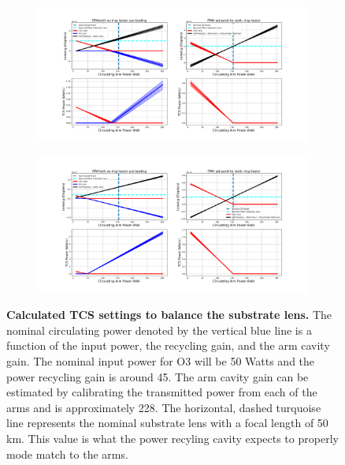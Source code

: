 \begin{figure}[ht]
	\centering
	\begin{subfigure}[b]{1.0\textwidth}
		\centering
		\includegraphics[width=\textwidth]{../Figures/ITMX_TCS_Settings.png}
		\label{fig:TCS_ITMX}
	\end{subfigure}
	\hfill
	\begin{subfigure}[b]{1.0\textwidth}
		\centering
		\includegraphics[width=\textwidth]{../Figures/ITMY_TCS_Settings.png}
		\label{fig:TCS_ITMY}
	\end{subfigure}
	\caption[Calculated TCS settings to balance the substrate lens.]{
		\textbf{Calculated TCS settings to balance the substrate lens.}  The nominal circulating power denoted by the vertical blue line is a function of the input power, the recycling gain, and the arm cavity gain.  The nominal input power for O3 will be 50 Watts and the power recycling gain is around 45.  The arm cavity gain can be estimated by calibrating the transmitted power from each of the arms and is approximately 228.  The horizontal, dashed turquoise line represents the nominal substrate lens with a focal length of 50 km.  This value is what the power recyling cavity expects to properly mode match to the arms. 
	}
	\label{fig:TCS_ITMs}
\end{figure}


